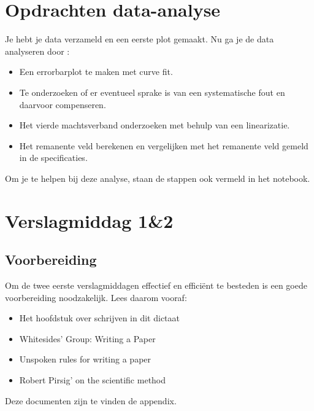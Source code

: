 \section{Opdrachten data-analyse}
Je hebt je data verzameld en een eerste plot gemaakt. Nu ga je de data analyseren door :
%
\begin{itemize}
    \item Een errorbarplot te maken met curve fit. 
    \item Te onderzoeken of er eventueel sprake is van een systematische fout en daarvoor compenseren.
    \item Het vierde machtsverband onderzoeken met behulp van een linearizatie.
    \item Het remanente veld berekenen en vergelijken met het remanente veld gemeld in de specificaties.
\end{itemize}
Om je te helpen bij deze analyse, staan de stappen ook vermeld in het notebook.
%
\section{Verslagmiddag 1\&2}
\subsection{Voorbereiding}
Om de twee eerste verslagmiddagen effectief en effici\"{e}nt te besteden is een goede voorbereiding noodzakelijk. Lees daarom vooraf:
\begin{itemize}
    \item Het hoofdstuk over schrijven in dit dictaat
    \item Whitesides’ Group: Writing a Paper
    \item Unspoken rules for writing a paper
    \item Robert Pirsig' on the scientific method
\end{itemize}
Deze documenten zijn te vinden de appendix.
%
